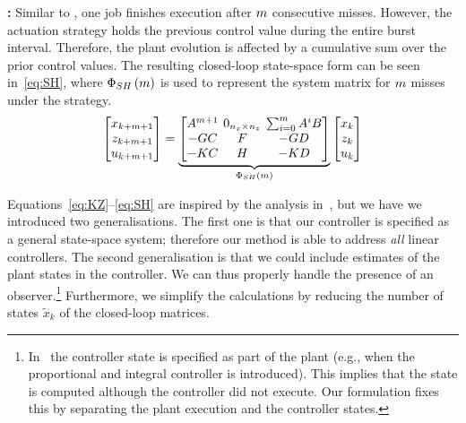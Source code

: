 \textbf{\tSH{}: }%
%
Similar to \tSZ{}, one job finishes execution after $m$ consecutive misses.
However, the actuation strategy holds the previous control value during the entire burst interval.
Therefore, the plant evolution is affected by a cumulative sum over the prior control values.
The resulting closed-loop state-space form can be seen in~\eqref{eq:SH}, where $\Phi{}_{SH}\left( m \right)$ is used to represent the system matrix for $m$ misses under the \tSH{} strategy.
%
\begin{equation}
\setlength\arraycolsep{2pt}
\label{eq:SH}
    \begin{bmatrix}
        x_{k+\nummisses+1} \\
        z_{k+\nummisses+1} \\
        u_{k+\nummisses+1}
    \end{bmatrix} = 
    \underbrace{\begin{bmatrix}
        \Ap^{\nummisses+1}  & 0_{n_x \times n_z}  & \sum_{i=0}^\nummisses \Ap^i\Bp \\
        -\Bc\Cp             & \Ac                                       & -\Bc\Dp \\
        -\Dc\Cp             & \Cc                                       & -\Dc\Dp
    \end{bmatrix}}_{\clmat{}_{SH}\funof{\nummisses}}
    \begin{bmatrix}
        x_{k} \\
        z_{k} \\
        u_{k}
    \end{bmatrix}
\end{equation}

Equations~\eqref{eq:KZ}--\eqref{eq:SH} are inspired by the analysis in~\cite{Maggio:2020}, but we have we introduced two generalisations.
The first one is that our controller is specified as a general state-space system; therefore our method is able to address \emph{all} linear controllers.
The second generalisation is that we could include estimates of the plant states in the controller.
We can thus properly handle the presence of an observer.\footnote{In~\cite{Maggio:2020} the controller state is specified as part of the plant (e.g., when the proportional and integral controller is introduced). This implies that the state is computed although the controller did not execute. Our formulation fixes this by separating the plant execution and the controller states.}
Furthermore, we simplify the calculations by reducing the number of states $\tilde{x}_k$ of the closed-loop matrices.

